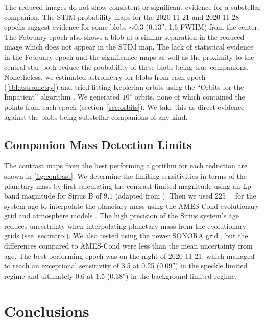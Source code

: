 \documentclass[twocolumn,linenumbers]{aastex631}
\begin{document}
The reduced images do not show consistent or significant evidence for a substellar companion. The STIM probability maps for the 2020-11-21 and 2020-11-28 epochs suggest evidence for some blobs $\sim$\qty{0.3}{\au} (\ang{;;0.13}; 1.6 FWHM) from the center. The February epoch also shows a blob at a similar separation in the reduced image which does not appear in the STIM map. The lack of statistical evidence in the February epoch and the significance maps as well as the proximity to the central star both reduce the probability of these blobs being true companions. Nonetheless, we estimated astrometry for blobs from each epoch (\cref{tbl:astrometry}) and tried fitting Keplerian orbits using the ``Orbits for the Impatient'' algorithm \citep[OFTI;][]{bluntOrbitsImpatientBayesian2017a}. We generated $10^4$ orbits, none of which contained the points from each epoch (section~\ref{sec:orbits}). We take this as direct evidence against the blobs being substellar companions of any kind.


\subsection{Companion Mass Detection Limits}

The contrast maps from the best performing algorithm for each reduction are shown in \cref{fig:contrast}. We determine the limiting sensitivities in terms of the planetary mass by first calculating the contrast-limited magnitude using an Lp-band magnitude for Sirius B of 9.1 (adapted from \citealp{bidaudADONISHighContrast2008a}). Then we used \qty{225}{\mega\year} for the system age to interpolate the planetary mass using the AMES-Cond evolutionary grid and atmosphere models . The high precision of the Sirius system's age reduces uncertainty when interpolating planetary mass from the evolutionary grids (see \cref{sec:intro}). We also tested using the newer SONORA grid , but the differences compared to AMES-Cond were less than the mean uncertainty from age. The best performing epoch was on the night of 2020-11-21, which managed to reach an exceptional sensitivity of \qty{3.5}{\jupitermass} at \qty{0.25}{\au} (\ang{;;0.09}) in the speckle limited regime and ultimately \qty{0.6}{\jupitermass} at \qty{1.5}{\au} (\ang{;;0.38}) in the background limited regime.

\section{Conclusions} \label{sec:conclusion}
\end{document}
